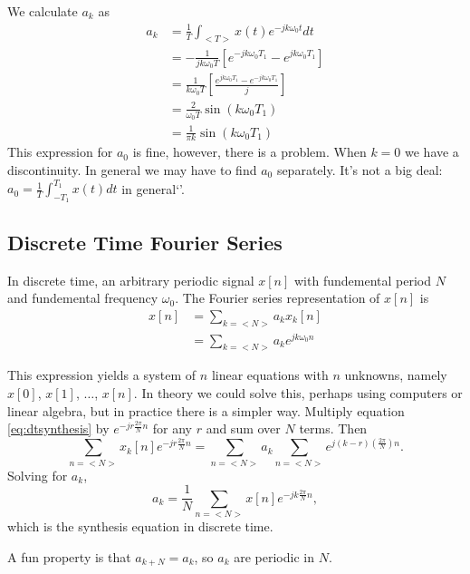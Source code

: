 We calculate $a_k$ as
\begin{align}
    a_k & = \frac{1}{T} \int_{<T>} x(t) e^{-jk\omega_0 t} dt                                         \\
        & = -\frac{1}{jk\omega_0 T} \left[ e^{-jk\omega_0 T_1} -  e^{jk\omega_0 T_1}\right]          \\
        & = \frac{1}{k\omega_0 T} \left[ \frac{e^{jk\omega_0 T_1} -  e^{-jk\omega_0 T_1}}{j} \right] \\
        & = \frac{2}{\omega_0 T} \sin(k \omega_0 T_1)                                                \\
        & = \frac{1}{\pi k} \sin(k \omega_0 T_1)
\end{align}
This expression for $a_0$ is fine, however, there is a problem. When
$k = 0$ we have a discontinuity. In general we may have to find $a_0$
separately. It's not a big deal: $a_0 = \frac{1}{T} \int_{-T_1}^{T_1} x(t) dt$ in general`'.

\subsection{Discrete Time Fourier Series}

In discrete time, an arbitrary periodic signal $x[n]$ with fundemental
period $N$ and fundemental frequency $\omega_0$. The Fourier series
representation of $x[n]$ is
\begin{align}\label{eq:dtsynthesis}
    x[n] & = \sum_{k=<N>} a_k x_k[n]           \\
         & = \sum_{k=<N>} a_k e^{jk\omega_0 n}
\end{align}

This expression yields a system of $n$ linear equations with $n$
unknowns, namely $x[0]$, $x[1]$, $\dots$, $x[n]$. In theory we
could solve this, perhaps using computers or linear algebra, but
in practice there is a simpler way. Multiply equation \ref{eq:dtsynthesis}
by $e^{-jr\frac{2\pi}{N}n}$ for any $r$ and sum over $N$ terms. Then
\begin{equation}
    \sum_{n=<N>} x_k[n] e^{-jr\frac{2\pi}{N}n} = \sum_{n=<N>} a_k \sum_{n=<N>} e^{j(k-r)(\frac{2\pi}{N})n}.
\end{equation}
Solving for $a_k$,
\begin{equation}
    a_k = \frac{1}{N} \sum_{n=<N>} x[n] e^{-jk\frac{2\pi}{N}n},
\end{equation}
which is the synthesis equation in discrete time.

A fun property is that $a_{k+N} = a_k$, so $a_k$ are periodic in $N$.

